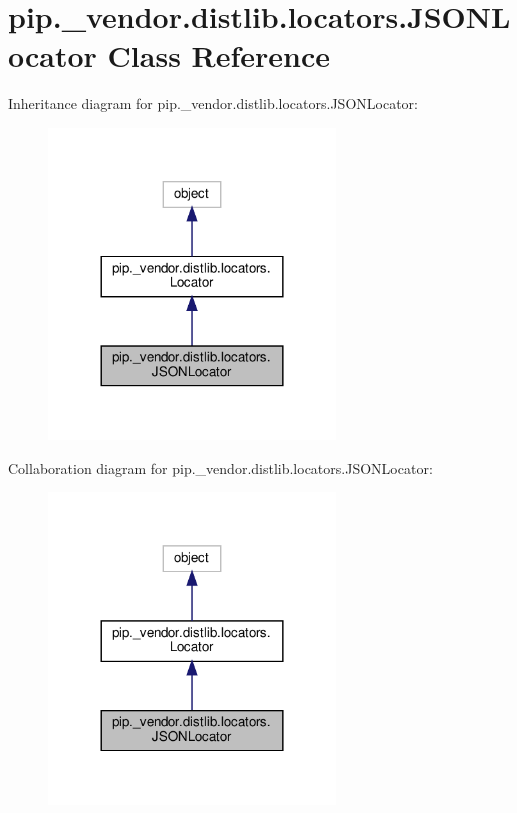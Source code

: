 \hypertarget{classpip_1_1__vendor_1_1distlib_1_1locators_1_1JSONLocator}{}\section{pip.\+\_\+vendor.\+distlib.\+locators.\+J\+S\+O\+N\+Locator Class Reference}
\label{classpip_1_1__vendor_1_1distlib_1_1locators_1_1JSONLocator}


Inheritance diagram for pip.\+\_\+vendor.\+distlib.\+locators.\+J\+S\+O\+N\+Locator\+:
\nopagebreak
\begin{figure}[H]
\begin{center}
\leavevmode
\includegraphics[width=216pt]{classpip_1_1__vendor_1_1distlib_1_1locators_1_1JSONLocator__inherit__graph}
\end{center}
\end{figure}


Collaboration diagram for pip.\+\_\+vendor.\+distlib.\+locators.\+J\+S\+O\+N\+Locator\+:
\nopagebreak
\begin{figure}[H]
\begin{center}
\leavevmode
\includegraphics[width=216pt]{classpip_1_1__vendor_1_1distlib_1_1locators_1_1JSONLocator__coll__graph}
\end{center}
\end{figure}
